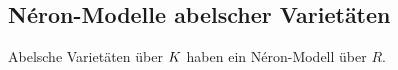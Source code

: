 \documentclass[german]{scrreprt}
\begin{document}
\subsection{Néron-Modelle abelscher Varietäten}
\begin{Korollar}\label{thm:exneronmodellabvarietaet}
  Abelsche Varietäten über $K$ haben ein Néron-Modell über $R$.
\end{Korollar}

\end{document}
